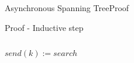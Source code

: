 \documentclass[pdf]{beamer}
\begin{document}
\begin{frame}[plain]{Asynchronous Spanning Tree}{Proof}
\begin{block}{Proof - Inductive step}
\begin{columns}
\begin{column}{.5\textwidth}
            \hspace*{9pt} {$send(k) := search$} 
    \end{column}
    \end{columns}
    \end{block}
\end{frame}
\end{document}
